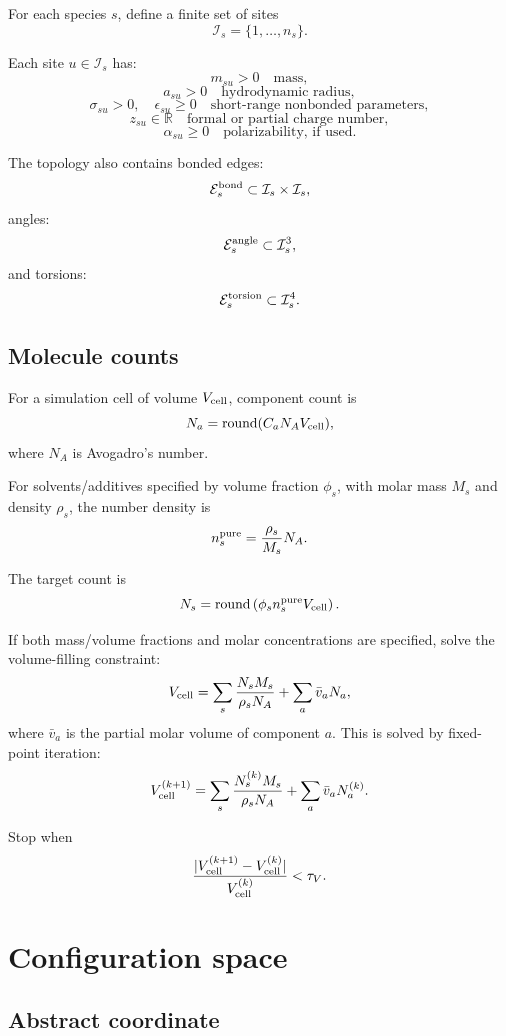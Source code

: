\documentclass[11pt]{article}
\begin{document}
For each species \(s\), define a finite set of sites
\[
\mathcal I_s=\{1,\ldots,n_s\}.
\]

Each site \(u\in\mathcal I_s\) has:
\[
m_{su}>0
\quad
\text{mass},
\]
\[
a_{su}>0
\quad
\text{hydrodynamic radius},
\]
\[
\sigma_{su}>0,\quad \epsilon_{su}\ge0
\quad
\text{short-range nonbonded parameters},
\]
\[
z_{su}\in\mathbb R
\quad
\text{formal or partial charge number},
\]
\[
\alpha_{su}\ge0
\quad
\text{polarizability, if used}.
\]

The topology also contains bonded edges:
\[
\mathcal E_s^{\rm bond}
\subset
\mathcal I_s\times\mathcal I_s,
\]
angles:
\[
\mathcal E_s^{\rm angle}
\subset
\mathcal I_s^3,
\]
and torsions:
\[
\mathcal E_s^{\rm torsion}
\subset
\mathcal I_s^4.
\]

\subsection{Molecule counts}

For a simulation cell of volume \(V_{\rm cell}\), component count is
\[
N_a=\operatorname{round}(C_aN_A V_{\rm cell}),
\]
where \(N_A\) is Avogadro's number.

For solvents/additives specified by volume fraction \(\phi_s\), with molar mass
\(M_s\) and density \(\rho_s\), the number density is
\[
n_s^{\rm pure}
=
\frac{\rho_s}{M_s}N_A.
\]

The target count is
\[
N_s
=
\operatorname{round}\left(
\phi_s n_s^{\rm pure} V_{\rm cell}
\right).
\]

If both mass/volume fractions and molar concentrations are specified, solve the
volume-filling constraint:
\[
V_{\rm cell}
=
\sum_s \frac{N_sM_s}{\rho_sN_A}
+
\sum_a \bar v_a N_a,
\]
where \(\bar v_a\) is the partial molar volume of component \(a\). This is solved
by fixed-point iteration:
\[
V_{\rm cell}^{(k+1)}
=
\sum_s \frac{N_s^{(k)}M_s}{\rho_sN_A}
+
\sum_a \bar v_a N_a^{(k)}.
\]

Stop when
\[
\frac{|V_{\rm cell}^{(k+1)}-V_{\rm cell}^{(k)}|}
{V_{\rm cell}^{(k)}}<\tau_V.
\]

\section{Configuration space}
\label{sec:configspace}

\subsection{Abstract coordinate}
\end{document}
